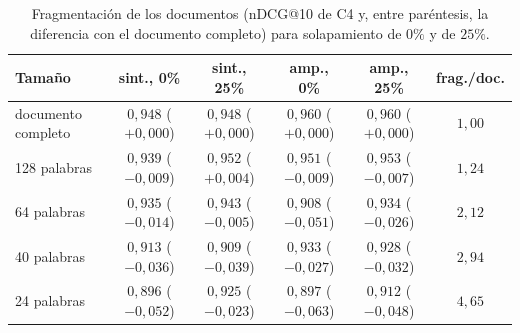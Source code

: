 \begin{table}[htbp]
\centering
\footnotesize
\setlength{\tabcolsep}{5pt}
\renewcommand{\arraystretch}{1.25}
\caption{Fragmentación de los documentos (nDCG@10 de C4 y, entre paréntesis, la diferencia con el documento completo) para solapamiento de $0\%$ y de $25\%$.}
\label{tab:chunking}
\begin{tabularx}{\textwidth}{@{}l c c c c c@{}}
\toprule
\textbf{Tamaño} & \textbf{sint., 0\%} & \textbf{sint., 25\%} & \textbf{amp., 0\%} & \textbf{amp., 25\%} & \textbf{frag./doc.} \\
\midrule
documento completo & $0{,}948$ ($+0{,}000$) & $0{,}948$ ($+0{,}000$) & $0{,}960$ ($+0{,}000$) & $0{,}960$ ($+0{,}000$) & $1{,}00$ \\
128 palabras & $0{,}939$ ($-0{,}009$) & $0{,}952$ ($+0{,}004$) & $0{,}951$ ($-0{,}009$) & $0{,}953$ ($-0{,}007$) & $1{,}24$ \\
64 palabras & $0{,}935$ ($-0{,}014$) & $0{,}943$ ($-0{,}005$) & $0{,}908$ ($-0{,}051$) & $0{,}934$ ($-0{,}026$) & $2{,}12$ \\
40 palabras & $0{,}913$ ($-0{,}036$) & $0{,}909$ ($-0{,}039$) & $0{,}933$ ($-0{,}027$) & $0{,}928$ ($-0{,}032$) & $2{,}94$ \\
24 palabras & $0{,}896$ ($-0{,}052$) & $0{,}925$ ($-0{,}023$) & $0{,}897$ ($-0{,}063$) & $0{,}912$ ($-0{,}048$) & $4{,}65$ \\
\bottomrule
\end{tabularx}
\end{table}

